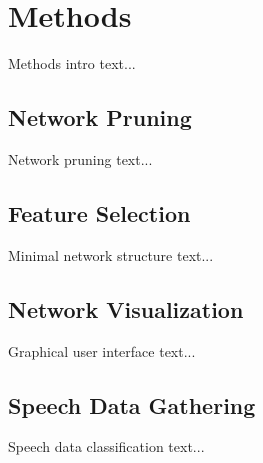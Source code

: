 \chapter{Methods} \label{chap:methods}
Methods intro text...

\section{Network Pruning} \label{sec:network_pruning}
Network pruning text...

\section{Feature Selection} \label{sec:feature_selection}
Minimal network structure text...

\section{Network Visualization} \label{sec:network_visualization}
Graphical user interface text...

\section{Speech Data Gathering} \label{sec:speech_data_gathering}
Speech data classification text...